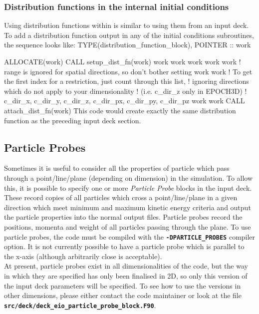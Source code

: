 \documentclass[12pt,a4paper]{article}
\newcommand{\inlinecode}[1]{{\color{warwickred} \bf\texttt{#1}}}
\newcommand{\EPOCH}{{\color{warwickdark}\fontfamily{phv}\selectfont{EPOCH}}}
\newenvironment{boxverbatim}{\lboxverbatim{none}}{\endlboxverbatim}
\begin{document}
\subsubsection{Distribution functions in the internal initial conditions}
Using distribution functions within {\EPOCH} is similar to using them from an
input deck. To add a distribution function output in any of the initial
conditions subroutines, the sequence looks like:
\begin{boxverbatim}
  TYPE(distribution_function_block), POINTER :: work

  ALLOCATE(work)
  CALL setup_dist_fn(work)
  work%
  work%
  work%
  work%
  work%
  ! range is ignored for spatial directions, so don't bother setting
  work%
  work%
  ! To get the first index for a restriction, just count through this list,
  ! ignoring directions which do not apply to your dimensionality
  ! (i.e. c_dir_z only in EPOCH3D)
  ! c_dir_x, c_dir_y, c_dir_z, c_dir_px, c_dir_py, c_dir_pz
  work%
  work%
  CALL attach_dist_fn(work)
\end{boxverbatim}
This code would create exactly the same distribution function as the
preceding input deck section.

\subsection{Particle Probes}
Sometimes it is useful to consider all the properties of particle which pass
through a point/line/plane (depending on dimension) in the simulation. To
allow this, it is possible to specify one or more {\it Particle Probe} blocks
in the input deck. These record copies of all particles which cross a
point/line/plane in a given direction which meet minimum and maximum kinetic
energy criteria and output the particle properties into the normal output
files. Particle probes record the positions, momenta and weight of all
particles passing through the plane. To use particle probes, the code must be
compiled with the \inlinecode{-DPARTICLE\_PROBES} compiler option. It is not
currently possible to have a particle probe which is parallel to the x-axis
(although arbitrarily close is acceptable). \\

At present, particle probes exist in all dimensionalities of the code, but the
way in which they are specified has only been finalised in 2D, so only this
version of the input deck parameters will be specified. To see how to use the
versions in other dimensions, please either contact the code maintainer or
look at the file \inlinecode{src/deck/deck\_eio\_particle\_probe\_block.F90}.\\
\end{document}
